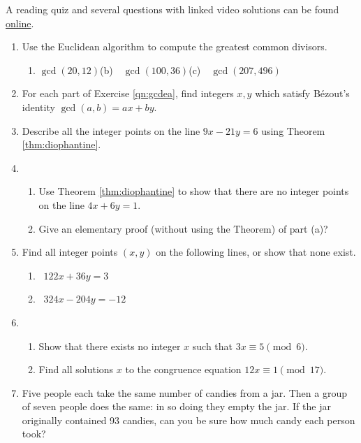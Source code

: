 \begin{exercises}{}{}
	A reading quiz and several questions with linked video solutions can be found \href{http://www.math.uci.edu/~ndonalds/math13/selftest/3-2-euclidalg.html}{online}.

\begin{enumerate}
  \item\label{qn:gcdea} Use the Euclidean algorithm to compute the greatest common divisors.
  \begin{enumerate}
    \item $\gcd(20,12)$\qquad (b)\ \ $\gcd(100,36)$\qquad (c)\ \ $\gcd(207,496)$
  \end{enumerate} 
  
  \item For each part of Exercise \ref*{qn:gcdea}, find integers $x,y$ which satisfy Bézout's identity $\gcd(a,b)=ax+by$.
  
  \item Describe all the integer points on the line $9x-21y=6$ using Theorem \ref{thm:diophantine}.
  
  
  \item\begin{enumerate}
    \item Use Theorem \ref{thm:diophantine} to show that there are no integer points on the line $4x+6y=1$.
  	\item Give an elementary proof (without using the Theorem) of part (a)?
  \end{enumerate} 
  
	\item Find all integer points $(x,y)$ on the following lines, or show that none exist.
    \begin{enumerate}
      \item {} \ $122x+36y=3$
      \setcounter{enumii}{2}
      \item {} \ $324x-204y=-12$
    \end{enumerate}
  
  \item\begin{enumerate}
    \item Show that there exists no integer $x$ such that $3x\equiv 5\pmod 6$.
    \item Find all solutions $x$ to the congruence equation $12x\equiv 1\pmod{17}$.
  \end{enumerate} 
    
  \item Five people each take the same number of candies from a jar. Then a group of seven people does the same: in so doing they empty the jar. If the jar originally contained 93 candies, can you be sure how much candy each person took?



\end{enumerate}
\end{exercises}

